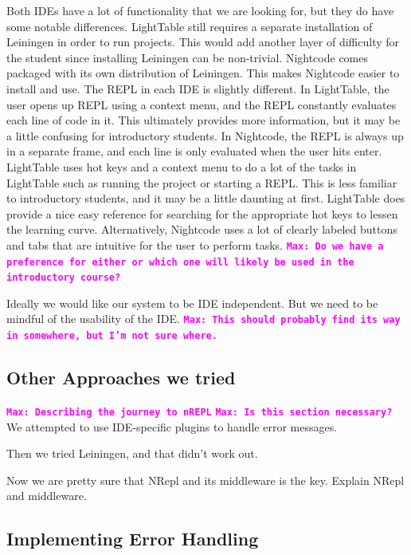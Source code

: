 \documentclass[12pt]{article}
\newcommand{\comment}[1]{{\bf \tt  {#1}}}
\newcommand{\mmcomment}[1]{\textcolor{magenta}{\comment{Max: {#1}}}}
\begin{document}
Both IDEs have a lot of functionality that we are looking for, but they do have some notable differences. LightTable still requires a separate installation of Leiningen in order to run projects. This would add another layer of difficulty for the student since installing Leiningen can be non-trivial. Nightcode comes packaged with its own distribution of Leiningen. This makes Nightcode easier to install and use. The REPL in each IDE is slightly different. In LightTable, the user opens up REPL using a context menu, and the REPL constantly evaluates each line of code in it. This ultimately provides more information, but it may be a little confusing for introductory students. In Nightcode, the REPL is always up in a separate frame, and each line is only evaluated when the user hits enter. LightTable uses hot keys and a context menu to do a lot of the tasks in LightTable such as running the project or starting a REPL. This is less familiar to introductory students, and it may be a little daunting at first. LightTable does provide a nice easy reference for searching for the appropriate hot keys to lessen the learning curve. Alternatively, Nightcode uses a lot of clearly labeled buttons and tabs that are intuitive for the user to perform tasks. \mmcomment{Do we have a preference for either or which one will likely be used in the introductory course?} 

Ideally we would like our system to be IDE independent. But we need to be mindful of the usability of the IDE. \mmcomment{This should probably find its way in somewhere, but I'm not sure where.}

\subsection{Other Approaches we tried}
\mmcomment{Describing the journey to nREPL}
\mmcomment{Is this section necessary?}
We attempted to use IDE-specific plugins to handle error messages.

Then we tried Leiningen, and that didn't work out.

Now we are pretty sure that NRepl and its middleware is the key. Explain NRepl and middleware.
\subsection{Implementing Error Handling}
\end{document}
